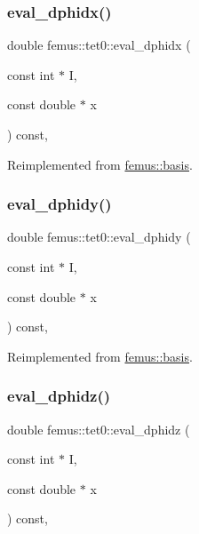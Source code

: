 \subsubsection{\texorpdfstring{eval\+\_\+dphidx()}{eval\_dphidx()}}
{\footnotesize\ttfamily double femus\+::tet0\+::eval\+\_\+dphidx (\begin{DoxyParamCaption}\item[{const int $\ast$}]{I,  }\item[{const double $\ast$}]{x }\end{DoxyParamCaption}) const\hspace{0.3cm}{\ttfamily [inline]}, {\ttfamily [virtual]}}



Reimplemented from \mbox{\hyperlink{classfemus_1_1basis_a4db7d29cf8a753ddbccc4a297dafa0bf}{femus\+::basis}}.

\mbox{\label{classfemus_1_1tet0_a1bbcc8a702fdb19e0b58f94bcfc98959}} 
\subsubsection{\texorpdfstring{eval\+\_\+dphidy()}{eval\_dphidy()}}
{\footnotesize\ttfamily double femus\+::tet0\+::eval\+\_\+dphidy (\begin{DoxyParamCaption}\item[{const int $\ast$}]{I,  }\item[{const double $\ast$}]{x }\end{DoxyParamCaption}) const\hspace{0.3cm}{\ttfamily [inline]}, {\ttfamily [virtual]}}



Reimplemented from \mbox{\hyperlink{classfemus_1_1basis_a2819fac9aae797156b9efec8a0b85cc1}{femus\+::basis}}.

\mbox{\label{classfemus_1_1tet0_ab4d0b4b59fcd80195ebeeaf1375db06b}} 
\subsubsection{\texorpdfstring{eval\+\_\+dphidz()}{eval\_dphidz()}}
{\footnotesize\ttfamily double femus\+::tet0\+::eval\+\_\+dphidz (\begin{DoxyParamCaption}\item[{const int $\ast$}]{I,  }\item[{const double $\ast$}]{x }\end{DoxyParamCaption}) const\hspace{0.3cm}{\ttfamily [inline]}, {\ttfamily [virtual]}}



